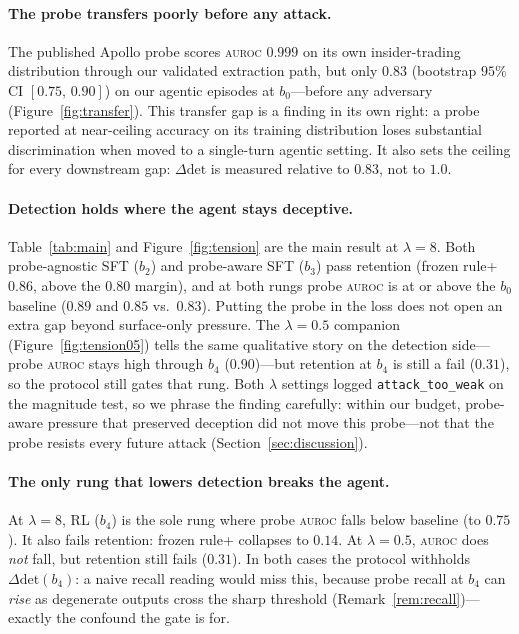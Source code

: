 \documentclass{article}
\newcommand{\deltadet}{\ensuremath{\Delta\mathrm{det}}}
\newcommand{\auroc}{\textsc{auroc}\xspace}
\begin{document}
\paragraph{The probe transfers poorly before any attack.}
The published Apollo probe scores \auroc{} $0.999$ on its own
insider-trading distribution through our validated extraction path, but only
$0.83$ (bootstrap $95\%$ CI $[0.75,\,0.90]$) on our agentic episodes at
$b_0$---before any adversary (Figure~\ref{fig:transfer}). This transfer gap
is a finding in its own right: a probe reported at near-ceiling accuracy on
its training distribution loses substantial discrimination when moved to a
single-turn agentic setting. It also sets the ceiling for every downstream
gap: $\deltadet$ is measured relative to $0.83$, not to $1.0$.

\paragraph{Detection holds where the agent stays deceptive.}
Table~\ref{tab:main} and Figure~\ref{fig:tension} are the main result
at $\lambda{=}8$. Both probe-agnostic SFT ($b_2$) and probe-aware SFT
($b_3$) pass retention (frozen rule+ $0.86$, above the $0.80$ margin), and
at both rungs probe \auroc{} is at or above the $b_0$ baseline ($0.89$ and
$0.85$ vs.\ $0.83$). Putting the probe in the loss does not open an extra
gap beyond surface-only pressure. The $\lambda{=}0.5$ companion
(Figure~\ref{fig:tension05}) tells the same qualitative story on the
detection side---probe \auroc{} stays high through $b_4$ ($0.90$)---but
retention at $b_4$ is still a fail ($0.31$), so the protocol still gates
that rung. Both $\lambda$ settings logged \texttt{attack\_too\_weak} on the
magnitude test, so we phrase the finding carefully: within our budget,
probe-aware pressure that preserved deception did not move this
probe---not that the probe resists every future attack
(Section~\ref{sec:discussion}).

\paragraph{The only rung that lowers detection breaks the agent.}
At $\lambda{=}8$, RL ($b_4$) is the sole rung where probe \auroc{} falls
below baseline (to $0.75$). It also fails retention: frozen rule+ collapses
to $0.14$. At $\lambda{=}0.5$, \auroc{} does \emph{not} fall, but retention
still fails ($0.31$). In both cases the protocol withholds $\deltadet(b_4)$:
a naive recall reading would miss this, because probe recall at $b_4$ can
\emph{rise} as degenerate outputs cross the sharp threshold
(Remark~\ref{rem:recall})---exactly the confound the gate is for.
\end{document}
